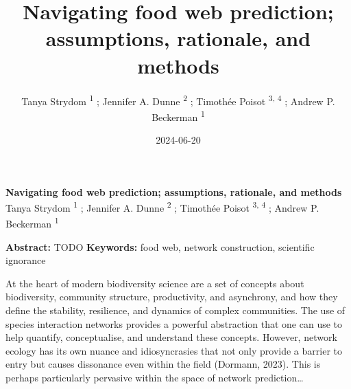 \documentclass[
]{article}
\title{Navigating food web prediction; assumptions, rationale, and
methods}
\author{Tanya Strydom %
%
\textsuperscript{%
%
1%
}%
; Jennifer A. Dunne %
%
\textsuperscript{%
%
2%
}%
; Timothée Poisot %
%
\textsuperscript{%
3,%
4%
}%
; Andrew P. Beckerman %
%
\textsuperscript{%
%
1%
}%
}
\date{2024-06-20}
\begin{document}
\thispagestyle{empty}
{\bfseries\sffamily\Large Navigating food web prediction; assumptions,
rationale, and methods}
\vfil
Tanya Strydom %
%
\textsuperscript{%
%
1%
}%
; Jennifer A. Dunne %
%
\textsuperscript{%
%
2%
}%
; Timothée Poisot %
%
\textsuperscript{%
3,%
4%
}%
; Andrew P. Beckerman %
%
\textsuperscript{%
%
1%
}%

\vfil
{\small
\textbf{Abstract:} TODO
\vfil
\textbf{Keywords:} %
food web, network construction, %
scientific ignorance%
}
\clearpage
\setcounter{page}{1}
\doublespacing
\linenumbers

At the heart of modern biodiversity science are a set of concepts about
biodiversity, community structure, productivity, and asynchrony, and how
they define the stability, resilience, and dynamics of complex
communities. The use of species interaction networks provides a powerful
abstraction that one can use to help quantify, conceptualise, and
understand these concepts. However, network ecology has its own nuance
and idiosyncrasies that not only provide a barrier to entry but causes
dissonance even within the field (Dormann, 2023). This is perhaps
particularly pervasive within the space of network prediction\ldots{}
\end{document}
